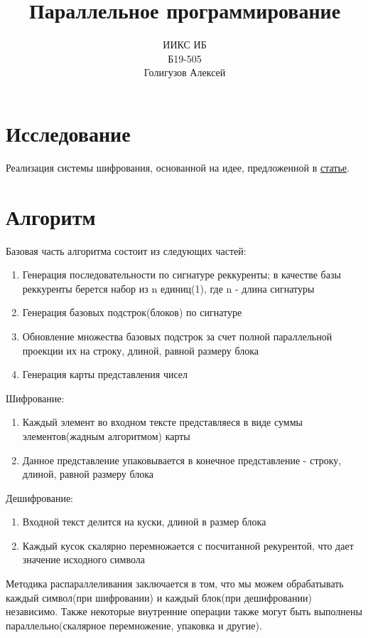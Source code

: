 \documentclass{article}
\title{Параллельное программирование\\}
\author{ИИКС ИБ\\Б19-505\\Голигузов Алексей}
\date
\begin{document}
\maketitle
\newpage
\tableofcontents

\newpage
\section{Исследование}
Реализация системы шифрования, основанной на идее, предложенной в \href{https://www.fq.math.ca/Papers1/50-2/HamlinWebb.pdf}{статье}.

\newpage
\section{Алгоритм}
Базовая часть алгоритма состоит из следующих частей:
\begin{enumerate}
    \item Генерация последовательности по сигнатуре реккуренты; в качестве базы
    реккуренты берется набор из n единиц(1), где n - длина сигнатуры
    \item Генерация базовых подстрок(блоков) по сигнатуре
    \item Обновление множества базовых подстрок за счет полной параллельной
    проекции их на строку, длиной, равной размеру блока
    \item Генерация карты представления чисел
\end{enumerate}

Шифрование:
\begin{enumerate}
    \item Каждый элемент во входном тексте представляеся в виде суммы элементов(жадным алгоритмом)
    карты
    \item Данное представление упаковывается в конечное представление - строку, длиной, равной размеру блока
\end{enumerate}

Дешифрование:
\begin{enumerate}
    \item Входной текст делится на куски, длиной в размер блока
    \item Каждый кусок скалярно перемножается с посчитанной рекурентой, что дает значение исходного символа
\end{enumerate}

Методика распараллеливания заключается в том, что мы можем обрабатывать каждый символ(при шифровании) 
и каждый блок(при дешифровании) независимо. Также некоторые внутренние операции также могут быть выполнены
параллельно(скалярное перемножение, упаковка и другие).
\end{document}
